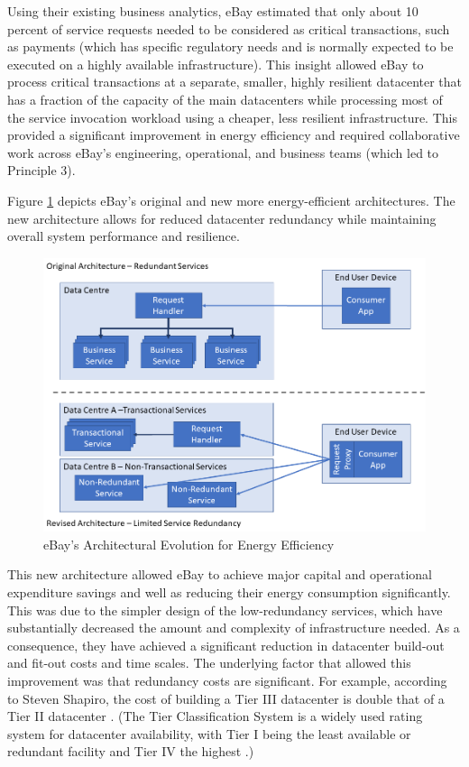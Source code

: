 Using their existing business analytics, eBay estimated that only about 10 percent of service requests needed to be considered as critical transactions, such as payments (which has specific regulatory needs and is normally expected to be executed on a highly available infrastructure). This insight allowed eBay to process critical transactions at a separate, smaller, highly resilient datacenter that has a fraction of the capacity of the main datacenters \cite{nelson2013-ebaycasestudy} while processing most of the service invocation workload using a cheaper, less resilient infrastructure. This provided a significant improvement in energy efficiency and required collaborative work across eBay's engineering, operational, and business teams (which led to Principle 3).

Figure \ref{figure:styles} depicts eBay's original and new more energy-efficient architectures. The new architecture allows for reduced datacenter redundancy while maintaining overall system performance and resilience.

\begin{figure}
\centering
\includegraphics[width=\textwidth]{Figures/principles-styles}
\caption{eBay's Architectural Evolution for Energy Efficiency}
\label{figure:styles}
\end{figure}

This new architecture allowed eBay to achieve major capital and operational expenditure savings and well as reducing their energy consumption significantly. This was due to the simpler design of the low-redundancy services, which have substantially decreased the amount and complexity of infrastructure needed.  As a consequence, they have achieved a significant reduction in datacenter build-out and fit-out costs and time scales. The underlying factor that allowed this improvement was that redundancy costs are significant. For example, according to Steven Shapiro, the cost of building a Tier III datacenter is double that of a Tier II datacenter \cite{shapiro2015-datacentre-mythsrealities}. (The Tier Classification System is a widely used rating system for datacenter availability, with Tier I being the least available or redundant facility and Tier IV the highest \cite{uptime2015-tierclassification}.)

